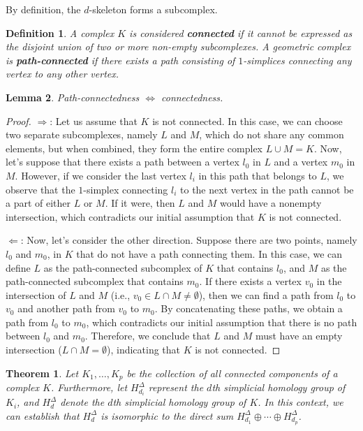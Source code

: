 \documentclass{amsart}
\newtheorem{theorem}{Theorem}
\newtheorem{definition}{Definition}[section]
\newtheorem{lemma}[definition]{Lemma}
\begin{document}
By definition, the $d$-skeleton forms a subcomplex.

\begin{definition}
A complex $K$ is considered \textbf{connected} if it cannot be expressed as the disjoint union of two or more non-empty subcomplexes. A geometric complex is \textbf{path-connected} if there exists a path consisting of $1$-simplices connecting any vertex to any other vertex.
\end{definition}

\begin{lemma}
\label{pathconnect}
Path-connectedness $\Longleftrightarrow$ connectedness.
\end{lemma}

\begin{proof}
\glqq $\Longrightarrow$\grqq{}: Let us assume that $K$ is not connected. In this case, we can choose two separate subcomplexes, namely $L$ and $M$, which do not share any common elements, but when combined, they form the entire complex $L \cup M = K$. Now, let's suppose that there exists a path between a vertex $l_0$ in $L$ and a vertex $m_0$ in $M$. However, if we consider the last vertex $l_i$ in this path that belongs to $L$, we observe that the $1$-simplex connecting $l_i$ to the next vertex in the path cannot be a part of either $L$ or $M$. If it were, then $L$ and $M$ would have a nonempty intersection, which contradicts our initial assumption that $K$ is not connected.

\glqq $\Longleftarrow$\grqq{}: Now, let's consider the other direction. Suppose there are two points, namely $l_0$ and $m_0$, in $K$ that do not have a path connecting them. In this case, we can define $L$ as the path-connected subcomplex of $K$ that contains $l_0$, and $M$ as the path-connected subcomplex that contains $m_0$. If there exists a vertex $v_0$ in the intersection of $L$ and $M$ (i.e., $v_0 \in L \cap M \neq \emptyset$), then we can find a path from $l_0$ to $v_0$ and another path from $v_0$ to $m_0$. By concatenating these paths, we obtain a path from $l_0$ to $m_0$, which contradicts our initial assumption that there is no path between $l_0$ and $m_0$. Therefore, we conclude that $L$ and $M$ must have an empty intersection ($L\cap M= \emptyset$), indicating that $K$ is not connected.
\end{proof}

\begin{theorem}
\label{decomptheorem}
Let $K_1, \ldots, K_p$ be the collection of all connected components of a complex $K$. Furthermore, let $H^\Delta_{d_i}$ represent the $d$th simplicial homology group of $K_i$, and $H^\Delta_d$ denote the $d$th simplicial homology group of $K$. In this context, we can establish that $H^\Delta_d$ is isomorphic to the direct sum $H^\Delta_{d_1} \oplus \cdots \oplus H^\Delta_{d_p}$.
\end{theorem}
\end{document}
